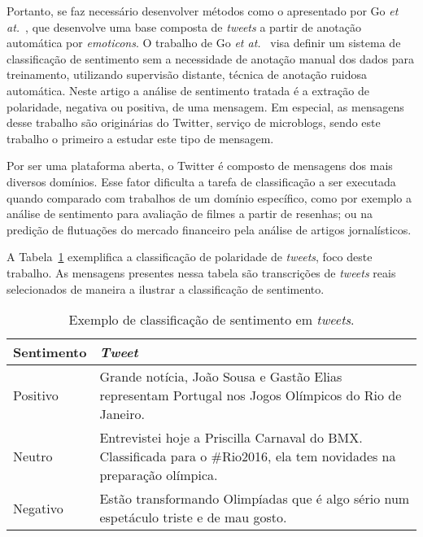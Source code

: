 Portanto, se faz necessário desenvolver métodos como o apresentado por Go \textit{et at.}~\cite{go09}, que desenvolve
uma base composta de \textit{tweets} a partir de anotação automática por \textit{emoticons}.
O trabalho de Go \textit{et at.}~\cite{go09} visa definir um sistema de classificação de sentimento sem a necessidade de
anotação manual dos dados para treinamento, utilizando supervisão distante, técnica de anotação ruidosa automática.
Neste artigo a análise de sentimento tratada é a extração de polaridade, negativa ou positiva, de uma mensagem.
Em especial, as mensagens desse trabalho são originárias do Twitter, serviço de microblogs, sendo este trabalho o
primeiro a estudar este tipo de mensagem.

Por ser uma plataforma aberta, o Twitter é composto de mensagens dos mais diversos domínios.
Esse fator dificulta a tarefa de classificação a ser executada quando comparado com trabalhos de um domínio específico,
como por exemplo a análise de sentimento para avaliação de filmes a partir de resenhas; ou na predição de flutuações do
mercado financeiro pela análise de artigos jornalísticos.

A Tabela~\ref{tab:sentiment} exemplifica a classificação de polaridade de \textit{tweets}, foco deste trabalho.
As mensagens presentes nessa tabela são transcrições de \textit{tweets} reais selecionados de maneira a ilustrar
a classificação de sentimento.

\begin{table}[h]
    \begin{center}
        \begin{tabular}{| l | p{10cm} |}
        \hline
        \textbf{Sentimento} & \textbf{\textit{Tweet}} \\ \hline
        Positivo & Grande notícia, João Sousa e Gastão Elias representam Portugal nos Jogos Olímpicos do Rio de Janeiro.
        \\ \hline
        Neutro & Entrevistei hoje a Priscilla Carnaval do BMX. Classificada para o \#Rio2016, ela tem novidades na
        preparação olímpica. \\ \hline
        Negativo & Estão transformando Olimpíadas que é algo sério num espetáculo triste e de mau gosto. \\ \hline
        \end{tabular}
        \caption{Exemplo de classificação de sentimento em \textit{tweets}.}
        \label{tab:sentiment}
    \end{center}
\end{table}


